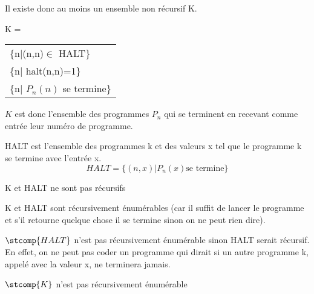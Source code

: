 Il existe donc au moins un ensemble non récursif
K.

\begin{mydef}[K]
	K =
	\begin{tabular}{l}
		\{n|(n,n)$\in$ HALT\}\\
		\{n| halt(n,n)=1\}\\
		\{n| $P_n(n)$ se termine\}
	\end{tabular}

	$K$ est donc l'ensemble des programmes $P_n$ qui se terminent en recevant comme entrée leur numéro de programme.
\end{mydef}

\begin{mydef}[HALT]
	HALT est l'ensemble des programmes k et des valeurs x tel que le programme k se termine avec l'entrée x.
	\[ HALT = \{(n,x)|P_n(x)\text{se termine}\}\]
\end{mydef}

\begin{myprop}
	K et HALT ne sont pas récursifs
\end{myprop}

\begin{myprop}
	K et HALT sont récursivement énumérables (car il suffit de lancer le programme et s’il retourne quelque chose il se termine sinon on ne peut rien dire).
\end{myprop}

\begin{myprop}
	$\stcomp{HALT}$ n'est pas récursivement énumérable sinon HALT serait récursif.  En effet, on ne peut pas coder un programme qui dirait si un autre programme k, appelé avec la valeur x, ne terminera jamais.
\end{myprop}

\begin{myprop}
	$\stcomp{K}$ n'est pas récursivement énumérable
\end{myprop}

